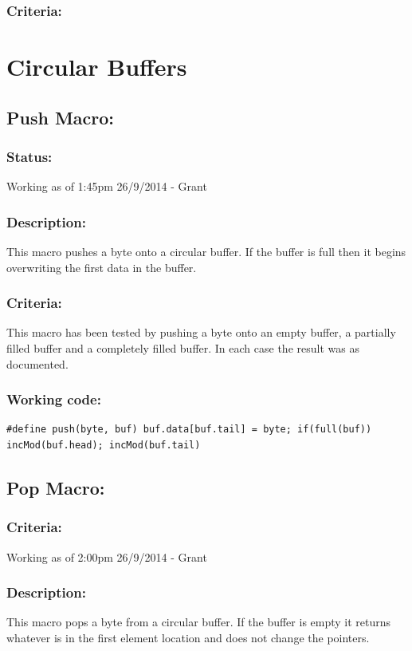 \documentclass[]{report}
\begin{document}
\subsubsection{Criteria:}

\newpage
\section{Circular Buffers}
\subsection{Push Macro:}
\subsubsection{Status:}
Working as of 1:45pm 26/9/2014 - Grant

\subsubsection{Description:}
This macro pushes a byte onto a circular buffer. If the buffer is full then it begins overwriting the first data in the buffer.

\subsubsection{Criteria:}
This macro has been tested by pushing a byte onto an empty buffer, a partially filled buffer and a completely filled buffer. In each case the result was as documented.

\subsubsection{Working code:}
\begin{lstlisting}
#define push(byte, buf) buf.data[buf.tail] = byte; if(full(buf)) incMod(buf.head); incMod(buf.tail)
\end{lstlisting}

\subsection{Pop Macro:}
\subsubsection{Criteria:}
Working as of 2:00pm 26/9/2014 - Grant

\subsubsection{Description:}
This macro pops a byte from a circular buffer. If the buffer is empty it returns whatever is in the first element location and does not change the pointers.
\end{document}

